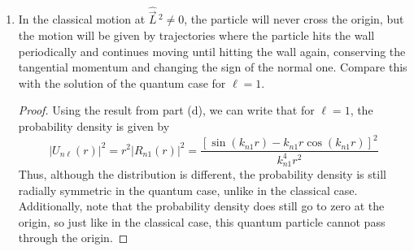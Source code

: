 \documentclass[../psets.tex]{subfiles}
\begin{document}
\begin{enumerate}
\begin{enumerate}
        \begin{proof}
            $\vec{L}^2$ is the eigenvalue of $\hat{\vec{L}}{\,}^2$, so if $\vec{L}^2=0$, then $\hbar^2\ell(\ell+1)=0$ and hence $\ell=0$. Thus, as in part (b), the probability density\footnote{Both Yunjia and Matt said in office hours that this interpretation of "probability density" --- i.e., as \emph{radial} probability density --- is the correct way to address this problem. This interpretation is also consistent with how Wagner used the phrase "probability density" in the 2/19 lecture to refer to $|U_{n\ell}|^2$. However, Nick said in office hours that the correct interpretation of "probability density" is as $|\psi|^2$, but to go with what the other two TAs and Wagner said because he's not grading this week.} is given by
            \begin{equation*}
                |U_{n\ell}(r)|^2 = \frac{2}{a}\sin^2\left( \frac{\pi nr}{a} \right)
            \end{equation*}
            One thing that this equation implies is that the probability density is always spherically symmetric, very similar to how the classical particle can move along any of the infinitely many paths through the origin. One place where the interpretations differ is that in the quantum case, the probability goes to zero near the origin while in the classical case, the probability is greatest at the origin (since every particle passes through it, regardless of which linear path it is on).
        \end{proof}
        \item In the classical motion at $\hat{\vec{L}}{\,}^2\neq 0$, the particle will never cross the origin, but the motion will be given by trajectories where the particle hits the wall periodically and continues moving until hitting the wall again, conserving the tangential momentum and changing the sign of the normal one. Compare this with the solution of the quantum case for $\ell=1$.
        \begin{proof}
            Using the result from part (d), we can write that for $\ell=1$, the probability density is given by
            \begin{equation*}
                |U_{n\ell}(r)|^2 = r^2|R_{n1}(r)|^2
                = \frac{[\sin(k_{n1}r)-k_{n1}r\cos(k_{n1}r)]^2}{k_{n1}^4r^2}
            \end{equation*}
            Thus, although the distribution is different, the probability density is still radially symmetric in the quantum case, unlike in the classical case. Additionally, note that the probability density does still go to zero at the origin, so just like in the classical case, this quantum particle cannot pass through the origin.

\end{proof}
\end{enumerate}
\end{enumerate}
\end{document}
